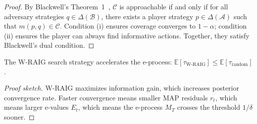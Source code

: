 \begin{proof}
By Blackwell's Theorem~1~\cite{ref12}, $\mathcal{C}$ is approachable if and only if for all adversary strategies $q \in \Delta(\mathcal{B})$, there exists a player strategy $p \in \Delta(\mathcal{A})$ such that $m(p, q) \in \mathcal{C}$. Condition (i) ensures coverage converges to $1-\alpha$; condition (ii) ensures the player can always find informative actions. Together, they satisfy Blackwell's dual condition.
\end{proof}

\begin{proposition}
\label{prop:coupling}
The W-RAIG search strategy accelerates the e-process: $\mathbb{E}[\tau_{\text{W-RAIG}}] \leq \mathbb{E}[\tau_{\text{random}}]$.
\end{proposition}

\begin{proof}[Proof sketch]
W-RAIG maximizes information gain, which increases posterior convergence rate. Faster convergence means smaller MAP residuals $r_t$, which means larger e-values $E_t$, which means the e-process $M_T$ crosses the threshold $1/\delta$ sooner.
\end{proof}